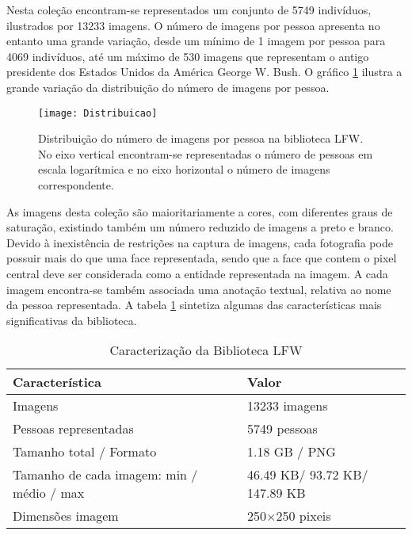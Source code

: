 Nesta coleção encontram-se representados um conjunto de 5749 indivíduos, ilustrados por 13233 imagens. O número de imagens por pessoa apresenta no entanto uma grande variação, desde um mínimo de 1 imagem por pessoa para 4069 indivíduos, até um máximo de 530 imagens que representam o antigo presidente dos Estados Unidos da América George W. Bush. O gráfico \ref{fig:distribuicaoLFW} ilustra a grande variação da distribuição do número de imagens por pessoa.

\begin{figure}[ht]
  \begin{center}
    \leavevmode
    \texttt{[image: Distribuicao]}
    \caption{Distribuição do número de imagens por pessoa na biblioteca LFW. No eixo vertical encontram-se representadas o número de pessoas em escala logarítmica e no eixo horizontal o número de imagens correspondente.}
    \label{fig:distribuicaoLFW}
  \end{center}
\end{figure}

As imagens desta coleção são maioritariamente a cores, com diferentes graus de saturação, existindo também um número reduzido de imagens a preto e branco. Devido à inexistência de restrições na captura de imagens, cada fotografia pode possuir mais do que uma face representada, sendo que a face que contem o pixel central deve ser considerada como a entidade representada na imagem. A cada imagem encontra-se também associada uma anotação textual, relativa ao nome da pessoa representada. A tabela \ref{tab:lfw} sintetiza algumas das características mais significativas da biblioteca.

\begin{center}
\begin{table}
	\caption{Caracterização da Biblioteca LFW}
	\begin{center}
    \begin{tabular}{ll}
    \hline
    Característica                            & Valor            \\ \hline
    Imagens                                   & 13233 imagens    \\
    Pessoas representadas                     & 5749 pessoas     \\
    Tamanho total / Formato                   & 1.18 GB / PNG     \\
    Tamanho de cada imagem: min / médio / max & 46.49 KB/ 93.72 KB/ 147.89 KB\\
    Dimensões imagem                          & 250$\times$250 pixeis \\
    \hline
    \end{tabular}
	\label{tab:lfw}
	\end{center}
\end{table}
\end{center}

